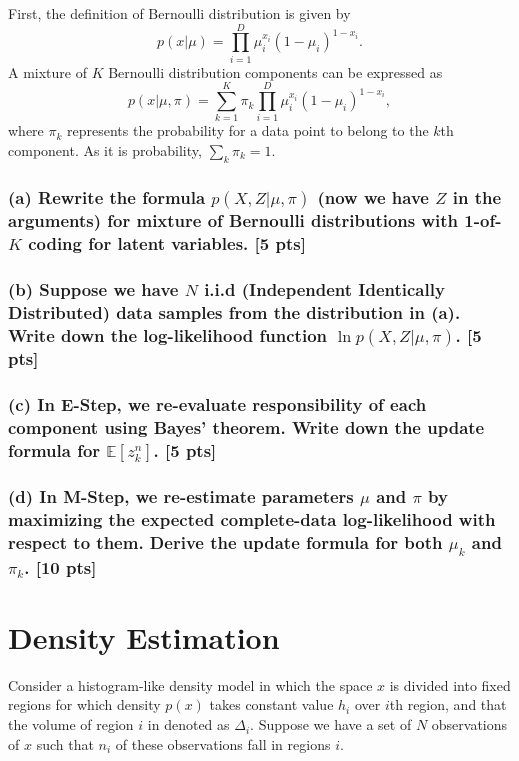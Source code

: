 \documentclass[twoside,10pt]{article}
\begin{document}
First, the definition of Bernoulli distribution is given by
\begin{equation}
p(x|\mu) = \prod_{i=1}^D \mu_i^{x_i} (1 - \mu_i)^{1 - x_i}.\nonumber
\end{equation}
A mixture of $K$ Bernoulli distribution components can be expressed
as
\begin{equation}
p(x|\mu, \pi) = \sum_{k=1}^K \pi_k \prod_{i=1}^D \mu_i^{x_i} (1 -
\mu_i)^{1 - x_i},\nonumber
\end{equation}
where $\pi_k$ represents the probability for a data point to belong
to the $k$th component. As it is probability, $\sum_k \pi_k = 1$.

\subsubsection*{(a) Rewrite the formula $p(X, Z|\mu, \pi)$
(now we have $Z$ in the arguments) for mixture of Bernoulli
distributions with 1-of-$K$ coding for latent variables. [5 pts]}

\subsubsection*{(b) Suppose we have $N$ i.i.d (Independent Identically
Distributed) data samples from the distribution in (a). Write down
the log-likelihood function $\ln p(X, Z|\mu, \pi)$. [5 pts]}

\subsubsection*{(c) In E-Step, we re-evaluate responsibility of each
component using Bayes' theorem. Write down the update formula for
$\mathbb{E}[z_k^n]$. [5 pts]}

\subsubsection*{(d) In M-Step, we re-estimate parameters $\mu$ and $\pi$
by maximizing the expected complete-data log-likelihood with respect
to them. Derive the update formula for both $\mu_k$ and $\pi_k$. [10
pts]}

\vspace{1cm} \fi


\section{Density Estimation}

Consider a histogram-like density model in which the space $x$ is
divided into fixed regions for which density $p(x)$ takes constant
value $h_i$ over $i$th region, and that the volume of region $i$ in
denoted as $\Delta_i$. Suppose we have a set of $N$ observations of
$x$ such that $n_i$ of these observations fall in regions $i$.
\end{document}
